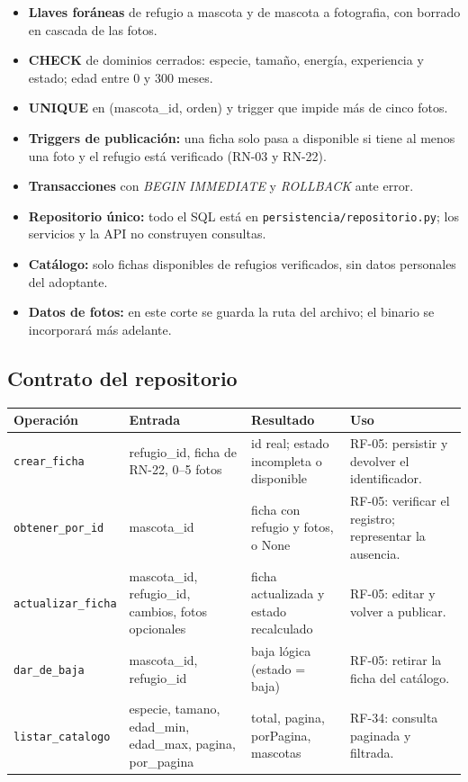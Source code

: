 \documentclass[11pt,a4paper]{article}
\newcommand{\code}[1]{\texttt{#1}}
\newcommand{\thead}[1]{\textbf{#1}}
\begin{document}
\noindent
\begin{minipage}[t]{0.49\linewidth}
\begin{itemize}
\item \textbf{Llaves foráneas} de refugio a mascota y de mascota a fotografia,
  con borrado en cascada de las fotos.
\item \textbf{CHECK} de dominios cerrados: especie, tamaño, energía,
  experiencia y estado; edad entre 0 y 300 meses.
\item \textbf{UNIQUE} en (mascota\_id, orden) y trigger que impide más de cinco
  fotos.
\item \textbf{Triggers de publicación:} una ficha solo pasa a disponible si
  tiene al menos una foto y el refugio está verificado (RN-03 y RN-22).
\end{itemize}
\end{minipage}\hfill
\begin{minipage}[t]{0.49\linewidth}
\begin{itemize}
\item \textbf{Transacciones} con \emph{BEGIN IMMEDIATE} y \emph{ROLLBACK} ante
  error.
\item \textbf{Repositorio único:} todo el SQL está en
  \code{persistencia/repositorio.py}; los servicios y la API no construyen
  consultas.
\item \textbf{Catálogo:} solo fichas disponibles de refugios verificados, sin
  datos personales del adoptante.
\item \textbf{Datos de fotos:} en este corte se guarda la ruta del archivo; el
  binario se incorporará más adelante.
\end{itemize}
\end{minipage}

\subsection{Contrato del repositorio}

{\footnotesize
\begin{tabularx}{\linewidth}{@{}V{1.0}V{0.95}V{1.15}V{0.9}@{}}
\toprule
\thead{Operación} & \thead{Entrada} & \thead{Resultado} & \thead{Uso} \\ \midrule
\code{crear\_ficha} & refugio\_id, ficha de RN-22, 0--5 fotos &
id real; estado incompleta o disponible & RF-05: persistir y devolver el
identificador. \\
\code{obtener\_por\_id} & mascota\_id & ficha con refugio y fotos, o None &
RF-05: verificar el registro; representar la ausencia. \\
\code{actualizar\_ficha} & mascota\_id, refugio\_id, cambios, fotos opcionales &
ficha actualizada y estado recalculado & RF-05: editar y volver a publicar. \\
\code{dar\_de\_baja} & mascota\_id, refugio\_id & baja lógica (estado = baja) &
RF-05: retirar la ficha del catálogo. \\
\code{listar\_catalogo} & especie, tamano, edad\_min, edad\_max, pagina,
por\_pagina & total, pagina, porPagina, mascotas &
RF-34: consulta paginada y filtrada. \\
\bottomrule
\end{tabularx}
}
\end{document}
